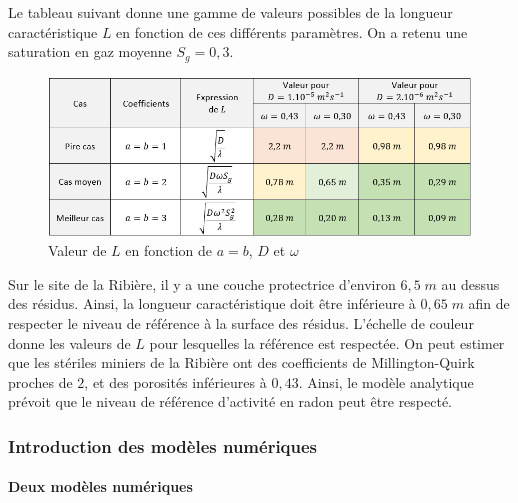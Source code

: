 \documentclass{article}
\begin{document}
Le tableau suivant donne une gamme de valeurs possibles de la longueur caractéristique $L$ en fonction de ces différents paramètres. On a retenu une saturation en gaz moyenne $S_g=0,3$.

\begin{figure}[H]
    \centering
    \includegraphics[width = \linewidth]{III_C_9.png}
    \caption{Valeur de $L$ en fonction de $a=b$, $D$ et $\omega$}
    \label{fig:sens_mq_poro}
\end{figure}

Sur le site de la Ribière, il y a une couche protectrice d'environ $6,5\;m$ au dessus des résidus. Ainsi, la longueur caractéristique doit être inférieure à $0,65\;m$ afin de respecter le niveau de référence à la surface des résidus. L'échelle de couleur donne les valeurs de $L$ pour lesquelles la référence est respectée. On peut estimer que les stériles miniers de la Ribière ont des coefficients de Millington-Quirk proches de $2$, et des porosités inférieures à $0,43$. Ainsi, le modèle analytique prévoit que le niveau de référence d'activité en radon peut être respecté.

\newpage
\subsubsection{Introduction des modèles numériques}

\paragraph{Deux modèles numériques}
\end{document}
